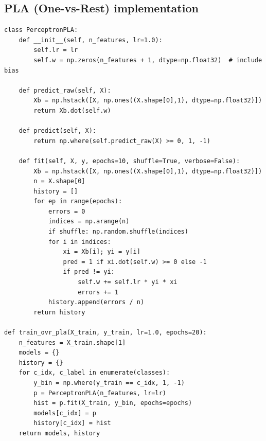 \documentclass[11pt,a4paper]{article}
\begin{document}
\subsection{PLA (One-vs-Rest) implementation}
\begin{lstlisting}[caption={Perceptron PLA class and OvR training}]
class PerceptronPLA:
    def __init__(self, n_features, lr=1.0):
        self.lr = lr
        self.w = np.zeros(n_features + 1, dtype=np.float32)  # include bias

    def predict_raw(self, X):
        Xb = np.hstack([X, np.ones((X.shape[0],1), dtype=np.float32)])
        return Xb.dot(self.w)

    def predict(self, X):
        return np.where(self.predict_raw(X) >= 0, 1, -1)

    def fit(self, X, y, epochs=10, shuffle=True, verbose=False):
        Xb = np.hstack([X, np.ones((X.shape[0],1), dtype=np.float32)])
        n = X.shape[0]
        history = []
        for ep in range(epochs):
            errors = 0
            indices = np.arange(n)
            if shuffle: np.random.shuffle(indices)
            for i in indices:
                xi = Xb[i]; yi = y[i]
                pred = 1 if xi.dot(self.w) >= 0 else -1
                if pred != yi:
                    self.w += self.lr * yi * xi
                    errors += 1
            history.append(errors / n)
        return history

def train_ovr_pla(X_train, y_train, lr=1.0, epochs=20):
    n_features = X_train.shape[1]
    models = {}
    history = {}
    for c_idx, c_label in enumerate(classes):
        y_bin = np.where(y_train == c_idx, 1, -1)
        p = PerceptronPLA(n_features, lr=lr)
        hist = p.fit(X_train, y_bin, epochs=epochs)
        models[c_idx] = p
        history[c_idx] = hist
    return models, history
\end{lstlisting}
\end{document}

